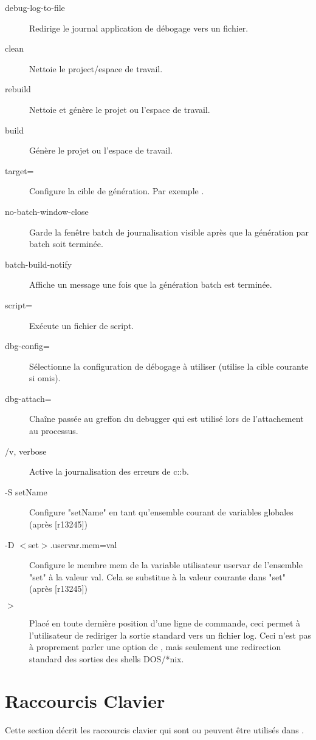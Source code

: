\begin{description}
\item[\opt{--}debug-log-to-file] Redirige le journal application de débogage vers un fichier.
\item[\opt{--}clean] Nettoie le project/espace de travail.
\item[\opt{--}rebuild] Nettoie et génère le projet ou l'espace de travail.
\item[\opt{--}build] Génère le projet ou l'espace de travail.
\item[\opt{--}target=] Configure la cible de génération. Par exemple .
\item[\opt{--}no-batch-window-close] Garde la fenêtre batch de journalisation visible après que la génération par batch soit terminée.
\item[\opt{--}batch-build-notify] Affiche un message une fois que la génération batch est terminée.
\item[\opt{--}script=] Exécute un fichier de script.
\item[\opt{--}dbg-config=] Sélectionne la configuration de débogage à utiliser (utilise la cible courante si omis).
\item[\opt{--}dbg-attach=] Chaîne passée au greffon du debugger qui est utilisé lors de l'attachement au processus.
\item[/v, \opt{--}verbose] Active la journalisation des erreurs de c::b.
\item[-S setName] Configure "setName" en tant qu'ensemble courant de variables globales (après [r13245])
\item[-D $<$set$>$.uservar.mem=val] Configure le membre mem de la variable utilisateur uservar de l'ensemble "set" à la valeur val. Cela se substitue à la valeur courante dans "set" (après [r13245])
\item[$>$ ] Placé en toute dernière position d'une ligne de commande, ceci permet à l'utilisateur de rediriger la sortie standard vers un fichier log. Ceci n'est pas à proprement parler une option de \codeblocks, mais seulement une redirection standard des sorties des shells DOS/*nix.
\end{description}
\fi

\section{Raccourcis Clavier}

Cette section décrit les raccourcis clavier qui sont ou peuvent être utilisés dans \codeblocks.

